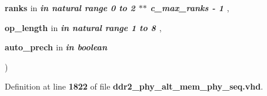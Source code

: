{\begin{DoxyParamCaption}
\item[{}]{{\bfseries \textcolor{vhdlchar}{ranks}\textcolor{vhdlchar}{ }}\textcolor{stringliteral}{in} {\em {\bfseries \textcolor{keywordflow}{in}\textcolor{vhdlchar}{ }\textcolor{comment}{natural}\textcolor{vhdlchar}{ }\textcolor{vhdlchar}{ }\textcolor{vhdlchar}{ }\textcolor{keywordflow}{range}\textcolor{vhdlchar}{ }\textcolor{vhdlchar}{ } \textcolor{vhdldigit}{0} \textcolor{vhdlchar}{ }\textcolor{keywordflow}{to}\textcolor{vhdlchar}{ }\textcolor{vhdlchar}{ } \textcolor{vhdldigit}{2} \textcolor{vhdlchar}{$\ast$}\textcolor{vhdlchar}{$\ast$}\textcolor{vhdlchar}{ }\textcolor{vhdlchar}{ }\textcolor{vhdlchar}{ }{\bfseries {\bf c\+\_\+max\+\_\+ranks}} \textcolor{vhdlchar}{-\/}\textcolor{vhdlchar}{ } \textcolor{vhdldigit}{1} \textcolor{vhdlchar}{ }}} , }
\item[{}]{{\bfseries \textcolor{vhdlchar}{op\+\_\+length}\textcolor{vhdlchar}{ }}\textcolor{stringliteral}{in} {\em {\bfseries \textcolor{keywordflow}{in}\textcolor{vhdlchar}{ }\textcolor{comment}{natural}\textcolor{vhdlchar}{ }\textcolor{vhdlchar}{ }\textcolor{vhdlchar}{ }\textcolor{keywordflow}{range}\textcolor{vhdlchar}{ }\textcolor{vhdlchar}{ } \textcolor{vhdldigit}{1} \textcolor{vhdlchar}{ }\textcolor{keywordflow}{to}\textcolor{vhdlchar}{ }\textcolor{vhdlchar}{ } \textcolor{vhdldigit}{8} \textcolor{vhdlchar}{ }}} , }
\item[{}]{{\bfseries \textcolor{vhdlchar}{auto\+\_\+prech}\textcolor{vhdlchar}{ }}\textcolor{stringliteral}{in} {\em {\bfseries \textcolor{keywordflow}{in}\textcolor{vhdlchar}{ }\textcolor{comment}{boolean}\textcolor{vhdlchar}{ }\textcolor{vhdlchar}{ }\textcolor{vhdlchar}{ }}}}
\end{DoxyParamCaption}
)\hspace{0.3cm}{\ttfamily [Function]}}\label{classddr2__phy__alt__mem__phy__addr__cmd__pkg_aa9735f89cd9a935bd598640693cb17e9}


Definition at line {\bf 1822} of file {\bf ddr2\+\_\+phy\+\_\+alt\+\_\+mem\+\_\+phy\+\_\+seq.\+vhd}.

